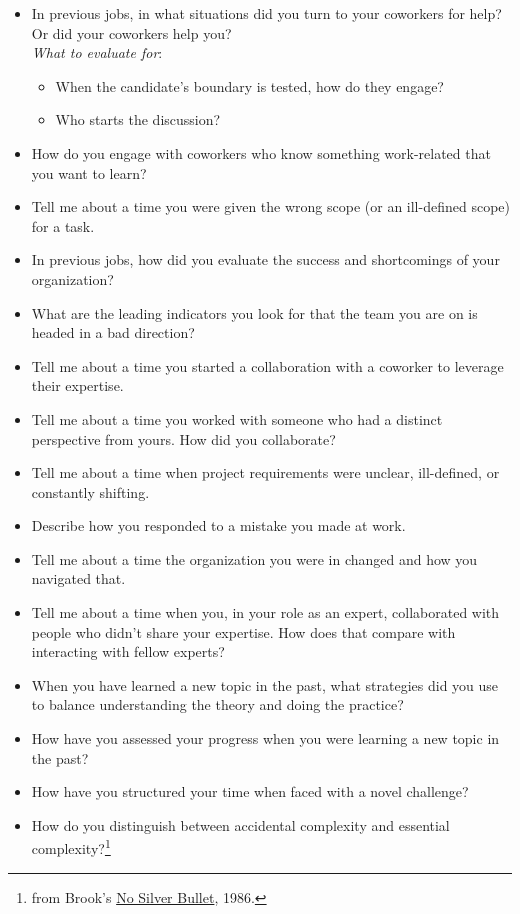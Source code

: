 \begin{itemize}
    \item In previous jobs, in what situations did you turn to your coworkers for help? Or did your coworkers help you?\\
    \textit{What to evaluate for}:
    \begin{itemize}
        \item When the candidate's boundary is tested, how do they engage?
        \item Who starts the discussion?
    \end{itemize}
    \item How do you engage with coworkers who know something work-related that you want to learn?
    \item Tell me about a time you were given the wrong scope (or an ill-defined scope) for a task. 
    \item In previous jobs, how did you evaluate the success and shortcomings of your organization?
    \item What are the leading indicators you look for that the team you are on is headed in a bad direction?
    \item Tell me about a time you started a collaboration with a coworker to leverage their expertise.
    \item Tell me about a time you worked with someone who had a distinct perspective from yours. How did you collaborate?
    \item Tell me about a time when project requirements were unclear, ill-defined, or constantly shifting.
    \item Describe how you responded to a mistake you made at work.
    \item Tell me about a time the organization you were in changed and how you navigated that. 
    \item Tell me about a time when you, in your role as an expert, collaborated with people who didn't share your expertise. How does that compare with interacting with fellow experts?
    \item When you have learned a new topic in the past, what strategies did you use to balance understanding the theory and doing the practice?
    \item How have you assessed your progress when you were learning a new topic in the past?
    \item How have you structured your time when faced with a novel challenge?
    \item How do you distinguish between accidental complexity and essential complexity?\footnote{from Brook's \href{https://en.wikipedia.org/wiki/No_Silver_Bullet}{No Silver Bullet}, 1986.}
\end{itemize}

